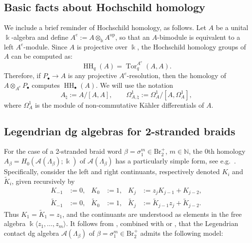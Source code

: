 \documentclass[11pt]{article}
\newcommand{\kk}{\Bbbk}
\newcommand{\La}{\Lambda}
\newcommand{\SA}{\mathcal A}
\newcommand{\Tor}{\operatorname{Tor}}
\newcommand{\op}{\mathrm{op}}
\newcommand{\HH}{\operatorname{HH}}
\newcommand{\Om}{\Omega}
\newcommand{\natq}{\natural}
\begin{document}
\subsection{ Basic facts about Hochschild homology}\label{ssec:hochschild_review} We include a brief reminder of Hochschild homology, as follows. Let $A$ be a unital $\kk$-algebra and define $A^e:=A\otimes_{\kk}A^{\op}$, so that an $A$-bimodule is equivalent to a left $A^e$-module.  Since $A$ is projective over $\kk$, the Hochschild homology groups of $A$ can be computed as:
\begin{equation}\label{eq:HHtor}
\HH_q(A)=\Tor_q^{A^e}(A,A).
\end{equation}
Therefore, if $P_\bullet\longrightarrow A$ is any projective $A^e$-resolution, then the homology of $A\otimes_{A^e}P_\bullet$ computes $\HH_\bullet(A)$. We will use the notation
\[
 A_\natq:=A/[A,A],\qquad
 \Om^1_{A,\natq}:=\Om^1_{A}/[A,\Om^1_{A}],
\]
where $\Om^1_{A}$ is the module of non-commutative K\"ahler differentials of $A$.


\subsection{ Legendrian dg algebras for 2-stranded braids}\label{ssec:dga_2stranded_review} For the case of a 2-stranded braid word $\beta=\sigma_1^{m}\in\mbox{Br}^+_2$, $m\in\mathbb{N}$, the $0$th homology $A_\beta=H_0(\SA(\La_\beta);\kk)$ of $\SA(\La_\beta)$ has a particularly simple form, see e.g.~\cite[Section 3]{chantraine2019representations}. Specifically, consider the left and right continuants, respectively denoted $K_{i}$ and $\widetilde K_i$, given recursively by
\begin{align*}
 K_{-1}&:=0,&K_0&:=1,&K_j&:=z_jK_{j-1}+K_{j-2},\\
 \widetilde K_{-1}&:=0,&\widetilde K_0&:=1,&
 \widetilde K_j&:=\widetilde K_{j-1}z_j+\widetilde K_{j-2}.
\end{align*}
Thus $K_1=\widetilde K_1=z_1$, and the continuants are understood as elements in the free algebra $\kk\langle z_1,\ldots,z_m\rangle$. It follows from , combined with \cite[Section 3]{chantraine2019representations} or \cite[Section 5.1]{CasalsNg}, that the Legendrian contact dg algebra $\SA(\La_\beta)$ of $\beta=\sigma_1^{m}\in\mbox{Br}^+_2$ admits the following model:
\end{document}
